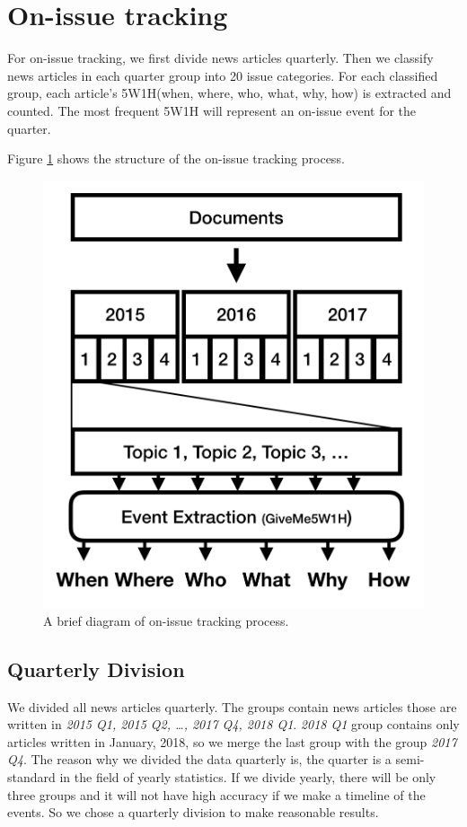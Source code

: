 \section{On-issue tracking}

For on-issue tracking, we first divide news articles quarterly.
Then we classify news articles in each quarter group into 20 issue categories.
For each classified group, each article’s 5W1H(when, where, who, what, why, how) is extracted and counted.
The most frequent 5W1H will represent an on-issue event for the quarter.

Figure \ref{fig:onissuedia} shows the structure of the on-issue tracking process.

\begin{figure}[!htbp]
  \centering
  \includegraphics[width=0.8\linewidth]{on_issue_1.png}
  \caption{A brief diagram of on-issue tracking process.}
  \label{fig:onissuedia}
\end{figure}

\subsection{Quarterly Division}

We divided all news articles quarterly.
The groups contain news articles those are written in \textit{2015 Q1, 2015 Q2, …, 2017 Q4, 2018 Q1}.
\textit{2018 Q1} group contains only articles written in January, 2018,
so we merge the last group with the group \textit{2017 Q4}.
The reason why we divided the data quarterly is, the quarter is a semi-standard in the field of yearly statistics.
If we divide yearly, there will be only three groups
and it will not have high accuracy if we make a timeline of the events.
So we chose a quarterly division to make reasonable results.

